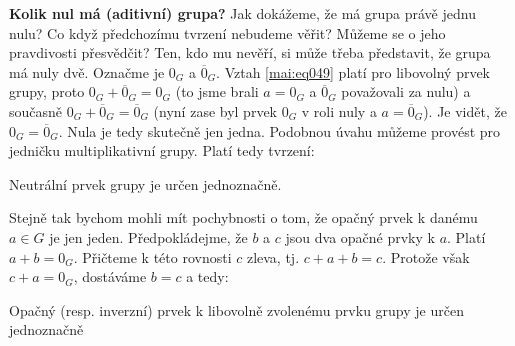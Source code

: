 \begin{mdframed}[style=mdexam]
  \begin{example}\label{mai:exam046}
    \textbf{Kolik nul má (aditivní) grupa?}\newline
    Jak dokážeme, že má grupa právě jednu nulu? Co když předchozímu tvrzení nebudeme věřit? Můžeme
    se o jeho pravdivosti přesvědčit? Ten, kdo mu nevěří, si může třeba představit, že grupa má nuly
    dvě. Označme je \(0_G\) a \(\overline{0}_G\). Vztah \ref{mai:eq049} platí pro libovolný prvek
    grupy, proto \(0_G + \overline{0}_G = 0_G\) (to jsme brali \(a = 0_G\) a \(\overline{0}_G\)
    považovali za nulu) a současně \(0_G + \overline{0}_G = \overline{0}_G\) (nyní zase byl prvek
    \(0_G\) v roli nuly a \(a = \overline{0}_G\)). Je vidět, že \(0_G = \overline{0}_G\). Nula je
    tedy skutečně jen jedna. Podobnou úvahu můžeme provést pro jedničku multiplikativní grupy. Platí
    tedy tvrzení:
    
    \begin{mdframed}[style=highlight]
      Neutrální prvek grupy je určen jednoznačně.
    \end{mdframed}  
    
    Stejně tak bychom mohli mít pochybnosti o tom, že opačný prvek k danému \(a\in G\) je jen jeden.
    Předpokládejme, že \(b\) a \(c\) jsou dva opačné prvky k \(a\). Platí \(a + b = 0_G\). Přičteme
    k této rovnosti \(c\) zleva, tj. \(c + a + b = c\). Protože však \(c + a = 0_G\), dostáváme
    \(b=c\) a tedy:
  
    \begin{mdframed}[style=highlight] 
      Opačný (resp. inverzní) prvek k libovolně zvolenému prvku grupy je určen jednoznačně
    \end{mdframed}
  \end{example}
\end{mdframed}